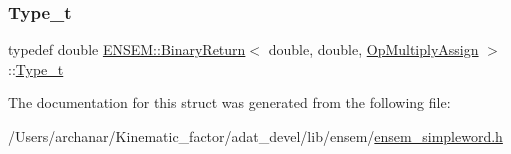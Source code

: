 \mbox{\label{structENSEM_1_1BinaryReturn_3_01double_00_01double_00_01OpMultiplyAssign_01_4_a68d7326bd6a61910b02ec674e3a92f01}} 
\subsubsection{\texorpdfstring{Type\_t}{Type\_t}\hspace{0.1cm}{\footnotesize\ttfamily [2/2]}}
{\footnotesize\ttfamily typedef double \mbox{\hyperlink{structENSEM_1_1BinaryReturn}{E\+N\+S\+E\+M\+::\+Binary\+Return}}$<$ double, double, \mbox{\hyperlink{structENSEM_1_1OpMultiplyAssign}{Op\+Multiply\+Assign}} $>$\+::\mbox{\hyperlink{structENSEM_1_1BinaryReturn_3_01double_00_01double_00_01OpMultiplyAssign_01_4_a68d7326bd6a61910b02ec674e3a92f01}{Type\+\_\+t}}}



The documentation for this struct was generated from the following file\+:\begin{DoxyCompactItemize}
\item 
/\+Users/archanar/\+Kinematic\+\_\+factor/adat\+\_\+devel/lib/ensem/\mbox{\hyperlink{lib_2ensem_2ensem__simpleword_8h}{ensem\+\_\+simpleword.\+h}}\end{DoxyCompactItemize}
